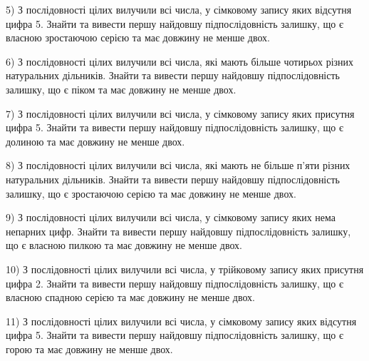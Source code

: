 \documentclass[11pt, ukrainian]{article}
\begin{document}
\par
\vspace{0.9cm}
5) \space 
З послідовності цілих вилучили всі числа, у сімковому запису яких відсутня цифра 5. Знайти та вивести першу найдовшу підпослідовність залишку, що є власною зростаючою серією та має довжину не менше двох.

\par
\vspace{0.9cm}
6) \space 
З послідовності цілих вилучили всі числа, які мають більше чотирьох різних натуральних дільників. Знайти та вивести першу найдовшу підпослідовність залишку, що є піком та має довжину не менше двох.

\par
\vspace{0.9cm}
7) \space 
З послідовності цілих вилучили всі числа, у сімковому запису яких присутня цифра 5. Знайти та вивести першу найдовшу підпослідовність залишку, що є долиною та має довжину не менше двох.

\par
\vspace{0.9cm}
8) \space 
З послідовності цілих вилучили всі числа, які мають не більше п'яти різних натуральних дільників. Знайти та вивести першу найдовшу підпослідовність залишку, що є зростаючою серією та має довжину не менше двох.

\par
\vspace{0.9cm}
9) \space 
З послідовності цілих вилучили всі числа, у сімковому запису яких нема непарних цифр. Знайти та вивести першу найдовшу підпослідовність залишку, що є власною пилкою та має довжину не менше двох.

\par
\vspace{0.9cm}
10) \space 
З послідовності цілих вилучили всі числа, у трійковому запису яких присутня цифра 2. Знайти та вивести першу найдовшу підпослідовність залишку, що є власною спадною серією та має довжину не менше двох.

\par
\vspace{0.9cm}
11) \space 
З послідовності цілих вилучили всі числа, у сімковому запису яких відсутня цифра 5. Знайти та вивести першу найдовшу підпослідовність залишку, що є горою та має довжину не менше двох.
\end{document}
